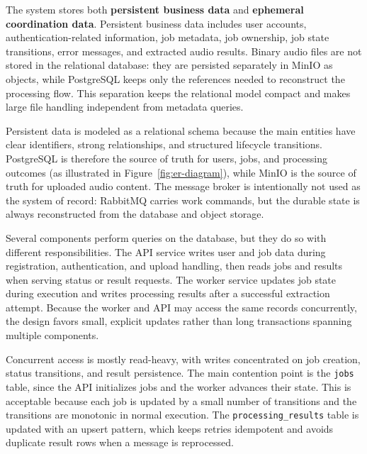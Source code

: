 \documentclass{scrartcl}
\begin{document}

The system stores both \textbf{persistent business data} and \textbf{ephemeral coordination data}.
Persistent business data includes user accounts, authentication-related information, job metadata, job ownership, job state transitions, error messages, and extracted audio results.
Binary audio files are not stored in the relational database: they are persisted separately in MinIO as objects, while PostgreSQL keeps only the references needed to reconstruct the processing flow.
This separation keeps the relational model compact and makes large file handling independent from metadata queries.

Persistent data is modeled as a relational schema because the main entities have clear identifiers, strong relationships, and structured lifecycle transitions.
PostgreSQL is therefore the source of truth for users, jobs, and processing outcomes (as illustrated in Figure~\ref{fig:er-diagram}), while MinIO is the source of truth for uploaded audio content.
The message broker is intentionally not used as the system of record: RabbitMQ carries work commands, but the durable state is always reconstructed from the database and object storage.

Several components perform queries on the database, but they do so with different responsibilities.
The API service writes user and job data during registration, authentication, and upload handling, then reads jobs and results when serving status or result requests.
The worker service updates job state during execution and writes processing results after a successful extraction attempt.
Because the worker and API may access the same records concurrently, the design favors small, explicit updates rather than long transactions spanning multiple components.

Concurrent access is mostly read-heavy, with writes concentrated on job creation, status transitions, and result persistence.
The main contention point is the \texttt{jobs} table, since the API initializes jobs and the worker advances their state.
This is acceptable because each job is updated by a small number of transitions and the transitions are monotonic in normal execution.
The \texttt{processing\_results} table is updated with an upsert pattern, which keeps retries idempotent and avoids duplicate result rows when a message is reprocessed.
\end{document}
